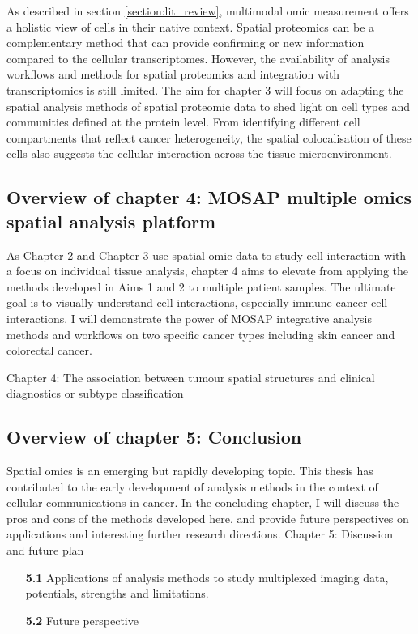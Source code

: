 As described in section \ref{section:lit_review}, multimodal omic measurement offers a holistic view of cells in their native context. Spatial proteomics can be a complementary method that can provide confirming or new information compared to the cellular transcriptomes. However, the availability of analysis workflows and methods for spatial proteomics and integration with transcriptomics is still limited. The aim for chapter 3 will focus on adapting the spatial analysis methods of spatial proteomic data to shed light on cell types and communities defined at the protein level. From identifying different cell compartments that reflect cancer heterogeneity, the spatial colocalisation of these cells also suggests the cellular interaction across the tissue microenvironment.             

\subsection{Overview of chapter 4: MOSAP multiple omics spatial analysis platform}
As Chapter 2 and Chapter 3 use spatial-omic data to study cell interaction with a focus on individual tissue analysis, chapter 4 aims to elevate from applying the methods developed in Aims 1 and 2 to multiple patient samples. The ultimate goal is to visually understand cell interactions, especially immune-cancer cell interactions. I will demonstrate the power of MOSAP integrative analysis methods and workflows on two specific cancer types including skin cancer and colorectal cancer.

Chapter 4: The association between tumour spatial structures and clinical diagnostics or subtype classification


\subsection{Overview of chapter 5: Conclusion}

Spatial omics is an emerging but rapidly developing topic. This thesis has contributed to the early development of analysis methods in the context of cellular communications in cancer. In the concluding chapter, I will discuss the pros and cons of the methods developed here, and provide future perspectives on applications and interesting further research directions. 
Chapter 5: Discussion and future plan
\begin{enumerate}[align=left]
    \item[\textbf{5.1}] Applications of analysis methods to study multiplexed imaging data, potentials, strengths and limitations. 
    \item[\textbf{5.2}] Future perspective
\end{enumerate}


% 
% 
